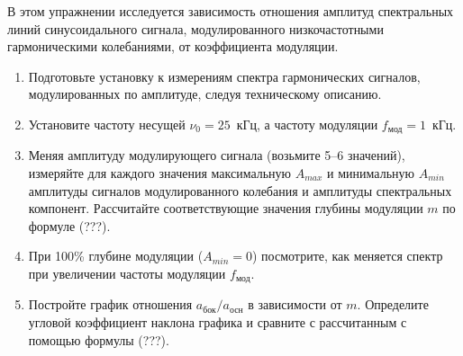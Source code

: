 \begin{lab:task}

В этом упражнении исследуется зависимость отношения амплитуд спектральных линий синусоидального сигнала, модулированного низкочастотными гармоническими колебаниями, от коэффициента модуляции.

\begin{enumerate}
	\item Подготовьте установку к измерениям спектра гармонических сигналов, модулированных по амплитуде, следуя техническому описанию.
	\item Установите частоту несущей $\nu_0 = 25$~кГц, а частоту модуляции $f_\text{мод} = 1$~кГц.
	\item Меняя амплитуду модулирующего сигнала (возьмите 5--6 значений), измеряйте для каждого значения максимальную $A_{max}$ и минимальную $A_{min}$ амплитуды сигналов модулированного колебания и амплитуды спектральных компонент.  Рассчитайте соответствующие значения глубины модуляции $m$ по формуле (???).
	\item При 100\% глубине модуляции ($A_{min} = 0$) посмотрите, как меняется спектр при увеличении частоты модуляции $f_\text{мод}$.
	\item Постройте график отношения $a_\text{бок}/a_\text{осн}$ в зависимости от $m$. Определите угловой коэффициент наклона графика и сравните с рассчитанным с помощью формулы (???).
\end{enumerate}


\end{lab:task}
